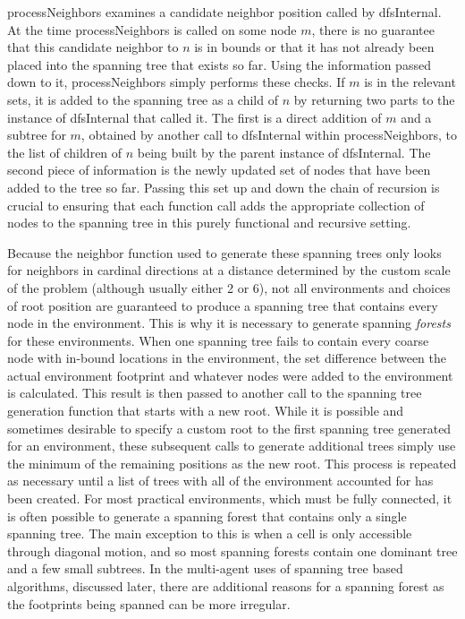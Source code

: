processNeighbors examines a candidate neighbor position called by dfsInternal. At the time processNeighbors is called on some node $m$, there is no guarantee that this candidate neighbor to $n$ is in bounds or that it has not already been placed into the spanning tree that exists so far. Using the information passed down to it, processNeighbors simply performs these checks. If $m$ is in the relevant sets, it is added to the spanning tree as a child of $n$ by returning two parts to the instance of dfsInternal that called it. The first is a direct addition of $m$ and a subtree for $m$, obtained by another call to dfsInternal within processNeighbors, to the list of children of $n$ being built by the parent instance of dfsInternal. The second piece of information is the newly updated set of nodes that have been added to the tree so far. Passing this set up and down the chain of recursion is crucial to ensuring that each function call adds the appropriate collection of nodes to the spanning tree in this purely functional and recursive setting.

Because the neighbor function used to generate these spanning trees only looks for neighbors in cardinal directions at a distance determined by the custom scale of the problem (although usually either 2 or 6), not all environments and choices of root position are guaranteed to produce a spanning tree that contains every node in the environment. This is why it is necessary to generate spanning \textit{forests} for these environments. When one spanning tree fails to contain every coarse node with in-bound locations in the environment, the set difference between the actual environment footprint and whatever nodes were added to the environment is calculated. This result is then passed to another call to the spanning tree generation function that starts with a new root. While it is possible and sometimes desirable to specify a custom root to the first spanning tree generated for an environment, these subsequent calls to generate additional trees simply use the minimum of the remaining positions as the new root. This process is repeated as necessary until a list of trees with all of the environment accounted for has been created. For most practical environments, which must be fully connected, it is often possible to generate a spanning forest that contains only a single spanning tree. The main exception to this is when a cell is only accessible through diagonal motion, and so most spanning forests contain one dominant tree and a few small subtrees. In the multi-agent uses of spanning tree based algorithms, discussed later, there are additional reasons for a spanning forest as the footprints being spanned can be more irregular.

